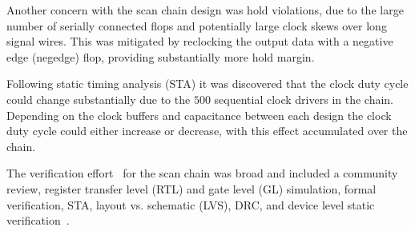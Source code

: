Another concern with the scan chain design was hold violations, due to the large number of serially connected flops and potentially large clock skews over long signal wires. This was mitigated by reclocking the output data with a negative edge (negedge) flop, providing substantially more hold margin.

Following static timing analysis (STA) it was discovered that the clock duty cycle could change substantially due to the \(500\) sequential clock drivers in the chain. Depending on the clock buffers and capacitance between each design the clock duty cycle could either increase or decrease, with this effect accumulated over the chain.

The verification effort~\cite{verificationmd} for the scan chain was broad and included a community review, register transfer level (RTL) and gate level (GL) simulation, formal verification\cite{sby}, STA, layout vs. schematic (LVS), DRC, and device level static verification~\cite{cvc}.
